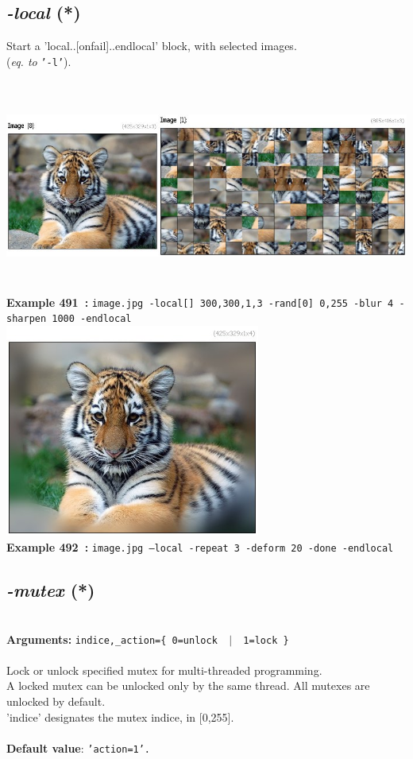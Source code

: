 \documentclass[a4paper,11pt,twoside]{book}
\begin{document}
\subsection{\emph{-local} (*)}\vspace*{-0.5em}
Start a 'local..[onfail]..endlocal' block, with selected images.
~\\(\emph{eq. to} {\small \texttt{'-l'}}).
\begin{center}\includegraphics[keepaspectratio=true,height=7cm,width=\textwidth]{img/gmic_def491.jpg}\\
{\footnotesize \textbf{Example 491~:} \texttt{image.jpg -local[] 300,300,1,3 -rand[0] 0,255 -blur 4 -sharpen 1000 -endlocal}}
\\\includegraphics[keepaspectratio=true,height=7cm,width=\textwidth]{img/gmic_def492.jpg}\\
{\footnotesize \textbf{Example 492~:} \texttt{image.jpg --local -repeat 3 -deform 20 -done -endlocal}}
\end{center}

\subsection{\emph{-mutex} (*)}\vspace*{-0.5em}
~\\\textbf{Arguments: } 
{\small \texttt{indice,\_action=\{ 0=unlock ~$|$~ 1=lock \}}}\\~\\
Lock or unlock specified mutex for multi-threaded programming.
~\\A locked mutex can be unlocked only by the same thread. All mutexes are unlocked by default.
~\\'indice' designates the mutex indice, in [0,255].
~\\~\\\textbf{Default value}: {\small \texttt{'action=1'.}}
\end{document}

